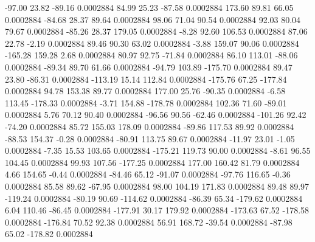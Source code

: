       -97.00       23.82      -89.16     0.0002884
       84.99       25.23      -87.58     0.0002884
      173.60       89.81       66.05     0.0002884
      -84.68       28.37       89.64     0.0002884
       98.06       71.04       90.54     0.0002884
       92.03       80.04       79.67     0.0002884
      -85.26       28.37      179.05     0.0002884
       -8.28       92.60      106.53     0.0002884
       87.06       22.78       -2.19     0.0002884
       89.46       90.30       63.02     0.0002884
       -3.88      159.07       90.06     0.0002884
     -165.28      159.28        2.68     0.0002884
       80.97       92.75      -71.84     0.0002884
       86.10      113.01      -88.06     0.0002884
      -89.34       89.70       61.66     0.0002884
      -94.79      103.89     -175.70     0.0002884
       89.47       23.80      -86.31     0.0002884
     -113.19       15.14      112.84     0.0002884
     -175.76       67.25     -177.84     0.0002884
       94.78      153.38       89.77     0.0002884
      177.00       25.76      -90.35     0.0002884
       -6.58      113.45     -178.33     0.0002884
       -3.71      154.88     -178.78     0.0002884
      102.36       71.60      -89.01     0.0002884
        5.76       70.12       90.40     0.0002884
      -96.56       90.56      -62.46     0.0002884
     -101.26       92.42      -74.20     0.0002884
       85.72      155.03      178.09     0.0002884
      -89.86      117.53       89.92     0.0002884
      -88.53      154.37       -0.28     0.0002884
      -80.91      113.75       89.67     0.0002884
      -11.97       23.01       -1.05     0.0002884
       -7.35       15.53      103.65     0.0002884
     -175.21      119.73       90.00     0.0002884
       -8.61       96.55      104.45     0.0002884
       99.93      107.56     -177.25     0.0002884
      177.00      160.42       81.79     0.0002884
        4.66      154.65       -0.44     0.0002884
      -84.46       65.12      -91.07     0.0002884
      -97.76      116.65       -0.36     0.0002884
       85.58       89.62      -67.95     0.0002884
       98.00      104.19      171.83     0.0002884
       89.48       89.97     -119.24     0.0002884
      -80.19       90.69     -114.62     0.0002884
      -86.39       65.34     -179.62     0.0002884
        6.04      110.46      -86.45     0.0002884
     -177.91       30.17      179.92     0.0002884
     -173.63       67.52     -178.58     0.0002884
     -176.84       70.52       92.38     0.0002884
       56.91      168.72      -39.54     0.0002884
      -87.98       65.02     -178.82     0.0002884
